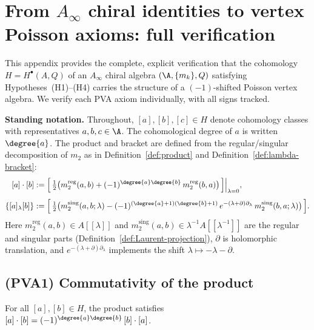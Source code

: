 \section{From $A_\infty$ chiral identities to vertex Poisson axioms: full verification}
\label{app:Ainfty-to-PVA-axioms}

This appendix provides the complete, explicit verification that the cohomology $H = H^\bullet(A,Q)$ of an $A_\infty$ chiral algebra $(\A, \{m_k\}, Q)$ satisfying Hypotheses~(H1)--(H4) carries the structure of a $(-1)$-shifted Poisson vertex algebra. We verify each PVA axiom individually, with all signs tracked.

\medskip

\noindent\textbf{Standing notation.} Throughout, $[a],[b],[c]\in H$ denote cohomology classes with representatives $a,b,c\in \A$. The cohomological degree of $a$ is written $\degree{a}$. The product and bracket are defined from the regular/singular decomposition of $m_2$ as in Definition~\ref{def:product} and Definition~\ref{def:lambda-bracket}:
\begin{align}
\label{eq:app-product-recall}
[a]\cdot [b] &:= \Bigl[\,\tfrac{1}{2}\bigl(m_2^{\mathrm{reg}}(a,b) + (-1)^{\degree{a}\degree{b}}\,m_2^{\mathrm{reg}}(b,a)\bigr)\,\Bigr]\Big|_{\lambda=0},\\[4pt]
\label{eq:app-bracket-recall}
\{[a]{}_\lambda [b]\} &:= \Bigl[\,\tfrac{1}{2}\bigl(m_2^{\mathrm{sing}}(a,b;\lambda) - (-1)^{(\degree{a}+1)(\degree{b}+1)}\, e^{-(\lambda+\partial)\partial_\lambda}\, m_2^{\mathrm{sing}}(b,a;\lambda)\bigr)\,\Bigr].
\end{align}
Here $m_2^{\mathrm{reg}}(a,b) \in A[[\lambda]]$ and $m_2^{\mathrm{sing}}(a,b) \in \lambda^{-1}A[[\lambda^{-1}]]$ are the regular and singular parts (Definition~\ref{def:Laurent-projection}), $\partial$ is holomorphic translation, and $e^{-(\lambda+\partial)\partial_\lambda}$ implements the shift $\lambda \mapsto -\lambda - \partial$.

\subsection{(PVA1) Commutativity of the product}

\begin{proposition}[Commutativity]
\label{prop:app-commutativity}
For all $[a],[b]\in H$, the product satisfies $[a]\cdot [b] = (-1)^{\degree{a}\degree{b}}\,[b]\cdot [a]$.
\end{proposition}

